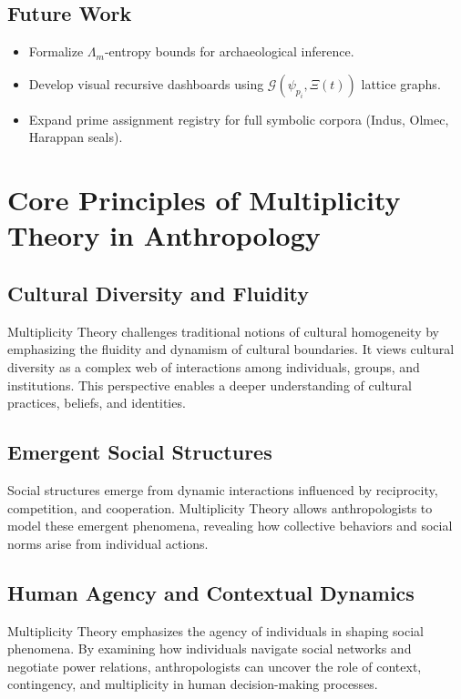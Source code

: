 \documentclass{article}
\theoremstyle{plain}
\begin{document}
\subsection{Future Work}
\begin{itemize}
    \item Formalize $\Lambda_m$-entropy bounds for archaeological inference.
    \item Develop visual recursive dashboards using $\mathcal{G}(\psi_{p_i}, \Xi(t))$ lattice graphs.
    \item Expand prime assignment registry for full symbolic corpora (Indus, Olmec, Harappan seals).
\end{itemize}


\section{Core Principles of Multiplicity Theory in Anthropology}

\subsection{Cultural Diversity and Fluidity}
Multiplicity Theory challenges traditional notions of cultural homogeneity by emphasizing the fluidity and dynamism of cultural boundaries. It views cultural diversity as a complex web of interactions among individuals, groups, and institutions. This perspective enables a deeper understanding of cultural practices, beliefs, and identities.

\subsection{Emergent Social Structures}
Social structures emerge from dynamic interactions influenced by reciprocity, competition, and cooperation. Multiplicity Theory allows anthropologists to model these emergent phenomena, revealing how collective behaviors and social norms arise from individual actions.

\subsection{Human Agency and Contextual Dynamics}
Multiplicity Theory emphasizes the agency of individuals in shaping social phenomena. By examining how individuals navigate social networks and negotiate power relations, anthropologists can uncover the role of context, contingency, and multiplicity in human decision-making processes.
\end{document}
